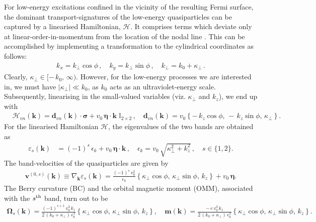 \documentclass[aps,prb,onecolumn,nofootinbib,citeautoscript,10pt]{revtex4-2}
\newcommand{\bs}[1]{\boldsymbol{#1}}
\begin{document}
For low-energy excitations confined in the vicinity of the resulting Fermi surface, the dominant transport-signatures of the low-energy quasiparticles can be captured by a linearised Hamiltonian, $\mathcal{H}$. It comprises terms which deviate only at linear-order-in-momentum from the location of the nodal line \cite{linearize-nlsm, ips-nlsm-ph}. This can be accomplished by implementing a transformation to the cylindrical coordinates as follows:
\begin{align}
\label{eqtrs}
k_x = k_\perp \cos \phi \,, \quad
k_y = k_\perp \sin \phi \,,\quad k_\perp =  k_0 + \kappa_\perp \,.
\end{align}
Clearly, $ \kappa_\perp \in [-\, k_0,\,\infty )$. However, for the low-energy processes we are interested in, we must have $|\kappa_\perp | \ll k_0 $, as $k_0$ acts as an ultraviolet-energy scale.
Subsequently, linearising in the small-valued variables (viz. $\kappa_\perp $ and $k_z$), we end up with
\begin{align}
\label{eqham}
& {\mathcal{H}}_{vn} (\bs k) = {\bs d}_{vn}  ( \bs k) \cdot \boldsymbol{\sigma}
+ v_0 \,{\bs \eta} \cdot {\bs k}\; \mathbb{I}_{2 \times 2} \,,
\quad
{\bs d}_{vn}  ( \bs k) = v_0 \left \lbrace  - \,k_z \cos \phi,\,
-\,k_z \sin \phi,\, \kappa_\perp \right \rbrace .
\end{align}
For the linearised Hamiltonian $\mathcal H$, the eigenvalues of the two bands are obtained as
\begin{align}
\label{eqev}
\varepsilon_s  ({ \bs k}) &= (-1)^s\, \epsilon_k  + v_0 \,{\bs \eta} \cdot {\bs k} \,, \quad 
 \epsilon_k = v_0\, \sqrt{ \kappa_\perp^2 +  k_z^2} \,,
\quad s \in \lbrace 1,2 \rbrace.
\end{align}
The band-velocities of the quasiparticles are given by
\begin{align}
\label{eqv}
{\boldsymbol v}^{(0,s)} ( \bs{k}) 
\equiv \nabla_{\bs{k}} \varepsilon_s  (\bs{k}) 
= \frac{ (-1)^s\, v_0^2}{\epsilon_k }  \left\lbrace 
\kappa_\perp \cos \phi, \, \kappa_\perp \sin\phi , \,k_z \right\rbrace
+  
v_0 \,{\bs \eta}  .
\end{align}
The Berry curvature (BC) and the orbital magnetic moment (OMM), associated with the $s^{\rm{th}}$ band, turn out to be
\begin{align}
\label{eqbcomm}
\bs \Omega_s ({ \bs k})= 
\frac{(-1)^{s+1} \, v_0^3\,k_z} 
{2\, (k_0 + \kappa_\perp )\, \epsilon_k^3}
\left\lbrace \kappa_\perp \cos \phi  , \, \kappa_\perp \sin \phi,\, k_z \right\rbrace, \quad 
{\boldsymbol{m}} ({ \bs k}) 
= \frac{ -\,e \, v_0^3\,k_z} 
{2\, (k_0 + \kappa_\perp )\, \epsilon_k^2}
\left\lbrace \kappa_\perp \cos \phi  , \, \kappa_\perp \sin \phi,\, k_z \right\rbrace.
\end{align}
\end{document}

